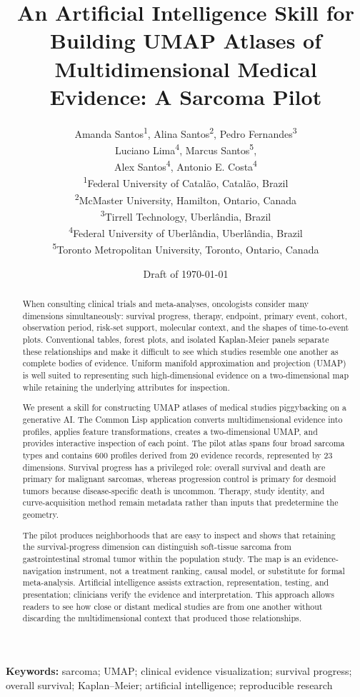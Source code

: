 \documentclass[17pt]{extarticle}
\title{An Artificial Intelligence Skill for Building UMAP Atlases of Multidimensional Medical Evidence: A Sarcoma Pilot}
\author{%
  Amanda Santos\textsuperscript{1}, Alina Santos\textsuperscript{2},
  Pedro Fernandes\textsuperscript{3}\\
Luciano Lima\textsuperscript{4}, Marcus Santos\textsuperscript{5},\\
Alex Santos\textsuperscript{4}, Antonio E. Costa\textsuperscript{4}\\[0.75em]
\small \textsuperscript{1}Federal University of Catalão, Catalão, Brazil\\
\small \textsuperscript{2}McMaster University, Hamilton, Ontario, Canada\\
\small \textsuperscript{3}Tirrell Technology, Uberlândia, Brazil\\
\small \textsuperscript{4}Federal University of Uberlândia, Uberlândia, Brazil\\
\small \textsuperscript{5}Toronto Metropolitan University, Toronto, Ontario, Canada}
\date{Draft of \today}
\begin{document}
\maketitle

\begin{abstract}
When consulting clinical trials and meta-analyses, oncologists consider many dimensions simultaneously: survival progress, therapy, endpoint, primary event, cohort, observation period, risk-set support, molecular context, and the shapes of time-to-event plots. Conventional tables, forest plots, and isolated Kaplan-Meier panels separate these relationships and make it difficult to see which studies resemble one another as complete bodies of evidence. Uniform manifold approximation and projection (UMAP) is well suited to representing such high-dimensional evidence on a two-dimensional map while retaining the underlying attributes for inspection.

We present a skill for constructing UMAP atlases of medical studies piggybacking on a generative AI. The Common Lisp application converts multidimensional evidence into profiles, applies feature transformations, creates a two-dimensional UMAP, and provides interactive inspection of each point.  The pilot atlas spans four broad sarcoma types and contains 600 profiles derived from 20 evidence records, represented by 23 dimensions. Survival progress has a privileged role: overall survival and death are primary for malignant sarcomas, whereas progression control is primary for desmoid tumors because disease-specific death is uncommon. Therapy, study identity, and curve-acquisition method remain metadata rather than inputs that predetermine the geometry.

The pilot produces neighborhoods that are easy to inspect and shows that retaining the survival-progress dimension can distinguish soft-tissue sarcoma from gastrointestinal stromal tumor within the population study. The map is an evidence-navigation instrument, not a treatment ranking, causal model, or substitute for formal meta-analysis. Artificial intelligence assists extraction, representation, testing, and presentation; clinicians verify the evidence and interpretation. This approach allows readers to see how close or distant medical studies are from one another without discarding the multidimensional context that produced those relationships.
\end{abstract}

\textbf{Keywords:} sarcoma; UMAP; clinical evidence visualization; survival progress; overall survival; Kaplan--Meier; artificial intelligence; reproducible research
\end{document}
